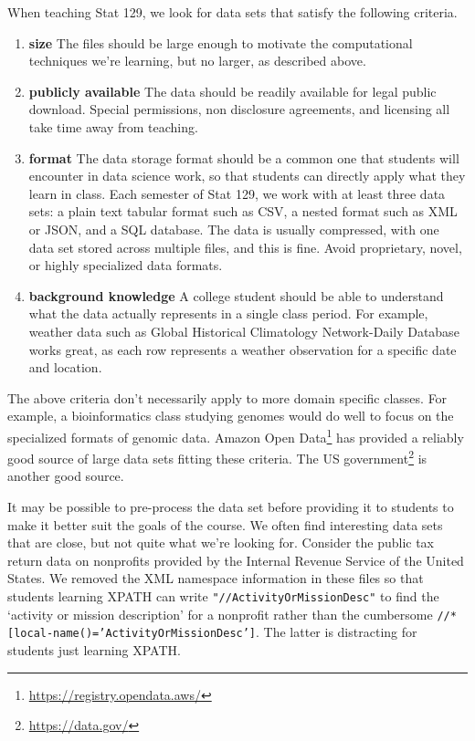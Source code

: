 \documentclass[12pt]{article}
\begin{document}
When teaching Stat 129, we look for data sets that satisfy the following criteria.
\begin{enumerate}
\item \textbf{size} The files should be large enough to motivate the computational techniques we're learning, but no larger, as described above.
\item \textbf{publicly available} The data should be readily available for legal public download.
	Special permissions, non disclosure agreements, and licensing all take time away from teaching.
\item \textbf{format} 
    The data storage format should be a common one that students will encounter in data science work, so that students can directly apply what they learn in class.
    Each semester of Stat 129, we work with at least three data sets: a plain text tabular format such as CSV, a nested format such as XML or JSON, and a SQL database.
    The data is usually compressed, with one data set stored across multiple files, and this is fine.
	Avoid proprietary, novel, or highly specialized data formats.
\item \textbf{background knowledge}
    A college student should be able to understand what the data actually represents in a single class period.
    For example, weather data such as Global Historical Climatology Network-Daily Database \cite{menne2012overview} works great, as each row represents a weather observation for a specific date and location.
\end{enumerate}
The above criteria don't necessarily apply to more domain specific classes. 
For example, a bioinformatics class studying genomes would do well to focus on the specialized formats of genomic data.
Amazon Open Data\footnote{\url{https://registry.opendata.aws/}} has provided a reliably good source of large data sets fitting these criteria. 
The US government\footnote{\url{https://data.gov/}} is another good source.

It may be possible to pre-process the data set before providing it to students to make it better suit the goals of the course.
We often find interesting data sets that are close, but not quite what we're looking for.
Consider the public tax return data on nonprofits provided by the Internal Revenue Service of the United States\cite{irs990}.
We removed the XML namespace information in these files so that students learning XPATH can write \texttt{"//ActivityOrMissionDesc"} to find the `activity or mission description' for a nonprofit rather than the cumbersome \texttt{//*[local-name()='ActivityOrMissionDesc']}.
The latter is distracting for students just learning XPATH.
\end{document}
